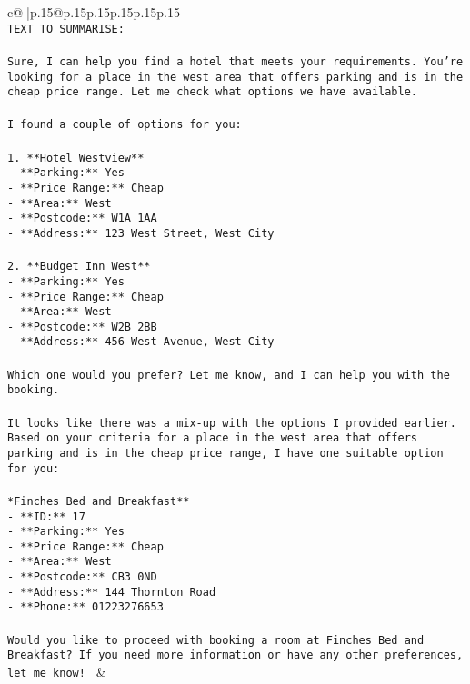 \documentclass{article}
\begin{document}
{\begin{supertabular}{c@{$\;$}|p{.15\linewidth}@{}p{.15\linewidth}p{.15\linewidth}p{.15\linewidth}p{.15\linewidth}p{.15\linewidth}}
{{{\tt \\ \tt TEXT TO SUMMARISE:\\ \tt \\ \tt Sure, I can help you find a hotel that meets your requirements. You're looking for a place in the west area that offers parking and is in the cheap price range. Let me check what options we have available.\\ \tt \\ \tt I found a couple of options for you:\\ \tt \\ \tt 1. **Hotel Westview**\\ \tt    - **Parking:** Yes\\ \tt    - **Price Range:** Cheap\\ \tt    - **Area:** West\\ \tt    - **Postcode:** W1A 1AA\\ \tt    - **Address:** 123 West Street, West City\\ \tt \\ \tt 2. **Budget Inn West**\\ \tt    - **Parking:** Yes\\ \tt    - **Price Range:** Cheap\\ \tt    - **Area:** West\\ \tt    - **Postcode:** W2B 2BB\\ \tt    - **Address:** 456 West Avenue, West City\\ \tt \\ \tt Which one would you prefer? Let me know, and I can help you with the booking.\\ \tt \\ \tt It looks like there was a mix-up with the options I provided earlier. Based on your criteria for a place in the west area that offers parking and is in the cheap price range, I have one suitable option for you:\\ \tt \\ \tt **Finches Bed and Breakfast**\\ \tt - **ID:** 17\\ \tt - **Parking:** Yes\\ \tt - **Price Range:** Cheap\\ \tt - **Area:** West\\ \tt - **Postcode:** CB3 0ND\\ \tt - **Address:** 144 Thornton Road\\ \tt - **Phone:** 01223276653\\ \tt \\ \tt Would you like to proceed with booking a room at Finches Bed and Breakfast? If you need more information or have any other preferences, let me know! 
	  } 
	   } 
	   } 
	 & \\ 
 


\end{supertabular}}
\end{document}
